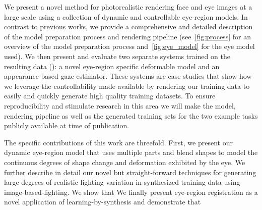 


We present a novel method for photorealistic rendering face and eye images at a large scale using a collection of dynamic and controllable eye-region models.
In contrast to previous works, we provide a comprehensive and detailed description of the model preparation process and rendering pipeline (see~\autoref{fig:process} for an overview of the model preparation process and~\autoref{fig:eye_model} for the eye model used).
We then present and evaluate two separate systems trained on the resulting data (\emph{\dataset}): a novel eye-region specific deformable model and an appearance-based gaze estimator.
These systems are case studies that show how we leverage the controllability made available by rendering our training data to easily and quickly generate high quality training datasets.
To ensure reproducibility and stimulate research in this area we will make the model, rendering pipeline as well as the generated training sets for the two example tasks publicly available at time of publication.

The specific contributions of this work are threefold.
First, we present our dynamic eye-region model that uses multiple parts and blend shapes to model the continuous degrees of shape change and deformation exhibited by the eye.
We further describe in detail our novel but straight-forward techniques for generating large degrees of realistic lighting variation in synthesized training data using image-based-lighting.
We show that 
We finally present eye-region registration as a novel application of learning-by-synthesis and demonstrate that 